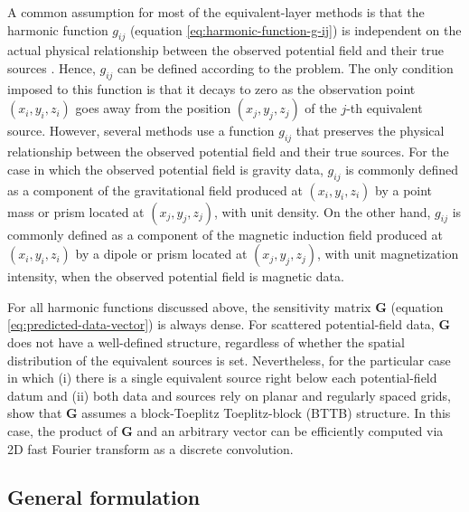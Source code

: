 A common assumption for most of the equivalent-layer methods is that the harmonic function $g_{ij}$ 
(equation \ref{eq:harmonic-function-g-ij}) is independent on the actual physical relationship between the
observed potential field and their true sources \cite[e.g.,][]{cordell1992, guspi-novara2009,li_etal_2014}.
Hence, $g_{ij}$ can be defined according to the problem.
The only condition imposed to this function is that it decays to zero as the observation point $(x_{i}, y_{i}, z_{i})$
goes away from the position $(x_{j}, y_{j}, z_{j})$ of the $j$-th equivalent source.
However, several methods use a function $g_{ij}$ that preserves the physical relationship between the
observed potential field and their true sources.
For the case in which the observed potential field is gravity data, $g_{ij}$ is commonly defined as a component of 
the gravitational field produced at $(x_{i}, y_{i}, z_{i})$ by a point mass or prism located at $(x_{j}, y_{j}, z_{j})$, with unit density.
On the other hand, $g_{ij}$ is commonly defined as a component of the 
magnetic induction field produced at $(x_{i}, y_{i}, z_{i})$ by a dipole or prism located at $(x_{j}, y_{j}, z_{j})$,
with unit magnetization intensity, when the observed potential field is magnetic data.

For all harmonic functions discussed above, the sensitivity matrix $\mathbf{G}$ (equation \ref{eq:predicted-data-vector}) 
is always dense. For scattered potential-field data, $\mathbf{G}$ does not have a well-defined structure, regardless of
whether the spatial distribution of the equivalent sources is set.
Nevertheless, for the particular case in which (i) there is a single equivalent source right below each potential-field
datum and (ii) both data and sources rely on planar and regularly spaced grids, \citet{takahashi-etal2020,takahashi-etal2022}
show that $\mathbf{G}$ assumes a block-Toeplitz Toeplitz-block (BTTB) structure. In this case, the product of $\mathbf{G}$ and an 
arbitrary vector can be efficiently computed via 2D fast Fourier transform as a discrete convolution.

\subsection{General formulation}
\label{subsec:general-formulation}

